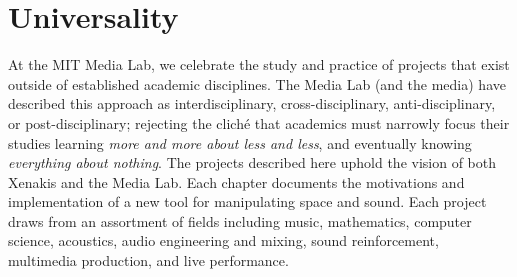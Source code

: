 \section{Universality}
\label{sec:universality}
At the MIT Media Lab, we celebrate the study and practice of projects
that exist outside of established academic disciplines. The Media Lab
(and the media) have described this approach as interdisciplinary,
cross-disciplinary, anti-disciplinary, or post-disciplinary; rejecting
the clich\'{e} that academics must narrowly focus their studies
learning \textit{more and more about less and less}, and eventually
knowing \textit{everything about nothing}.  The projects described
here uphold the vision of both Xenakis and the Media Lab. Each chapter
documents the motivations and implementation of a new tool for
manipulating space and sound. Each project draws from an assortment of
fields including music, mathematics, computer science, acoustics,
audio engineering and mixing, sound reinforcement, multimedia
production, and live performance. 







